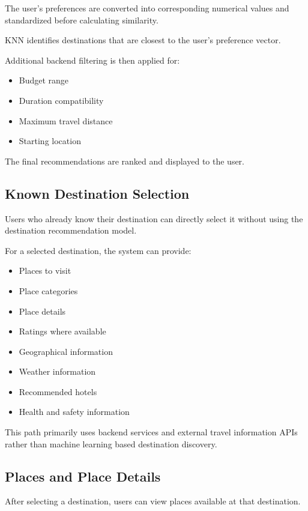 \documentclass[11pt,a4paper]{article}
\begin{document}
The user's preferences are converted into corresponding numerical values and standardized before calculating similarity.

KNN identifies destinations that are closest to the user's preference vector.

Additional backend filtering is then applied for:

\begin{itemize}
\item Budget range
\item Duration compatibility
\item Maximum travel distance
\item Starting location
\end{itemize}

The final recommendations are ranked and displayed to the user.


\subsection{Known Destination Selection}

Users who already know their destination can directly select it without using the destination recommendation model.

For a selected destination, the system can provide:

\begin{itemize}
\item Places to visit
\item Place categories
\item Place details
\item Ratings where available
\item Geographical information
\item Weather information
\item Recommended hotels
\item Health and safety information
\end{itemize}

This path primarily uses backend services and external travel information APIs rather than machine learning based destination discovery.


\subsection{Places and Place Details}

After selecting a destination, users can view places available at that destination.
\end{document}
